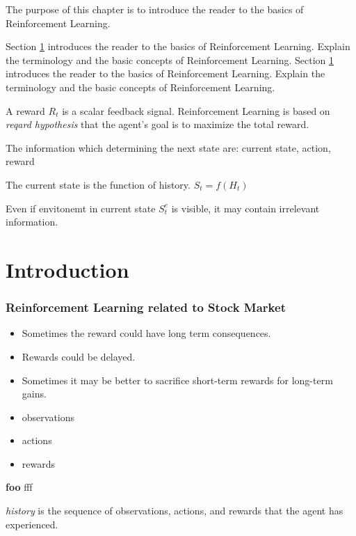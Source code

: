 The purpose of this chapter is to introduce the reader to the basics of Reinforcement Learning.

Section \ref{sec:rl-introduction} introduces the reader to the basics of Reinforcement Learning.
Explain the terminology and the basic concepts of Reinforcement Learning.
Section \ref{sec:rl-introduction} introduces the reader to the basics of Reinforcement Learning.
Explain the terminology and the basic concepts of Reinforcement Learning.

A reward $R_t$ is a scalar feedback signal.
Reinforcement Learning is based on \textit{reqard hypothesis} that the agent's goal is to maximize the total reward.

The information which determining the next state are: current state, action, reward

The current state is the function of history.
$S_t = f(H_t)$

Even if envitonemt in current state $S_{t}^{e}$ is visible, it may contain irrelevant information.


\section{Introduction}\label{sec:rl-introduction}

\subsubsection{Reinforcement Learning related to Stock Market}\label{subsec:rl-introduction}
\begin{itemize}
    \item Sometimes the reward could have long term consequences.
    \item Rewards could be delayed.
    \item Sometimes it may be better to sacrifice short-term rewards for long-term gains.
\end{itemize}

\begin{itemize}
    \item observations
    \item actions
    \item rewards
\end{itemize}

\textbf{foo}
\textrm{fff}


\begin{definition}
    \textit{history} is the sequence of observations, actions, and rewards that the agent has experienced.
\end{definition}


